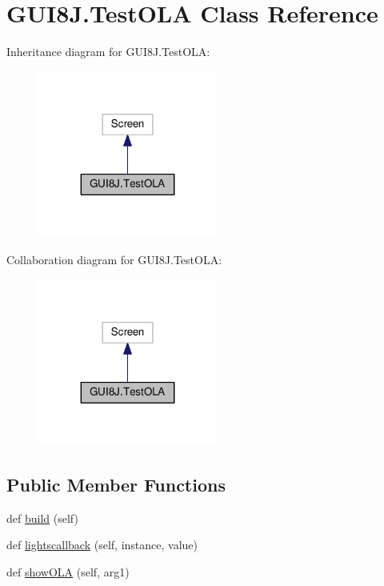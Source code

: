 \hypertarget{classGUI8J_1_1TestOLA}{}\section{G\+U\+I8\+J.\+Test\+O\+LA Class Reference}
\label{classGUI8J_1_1TestOLA}


Inheritance diagram for G\+U\+I8\+J.\+Test\+O\+LA\+:
\nopagebreak
\begin{figure}[H]
\begin{center}
\leavevmode
\includegraphics[width=167pt]{classGUI8J_1_1TestOLA__inherit__graph}
\end{center}
\end{figure}


Collaboration diagram for G\+U\+I8\+J.\+Test\+O\+LA\+:
\nopagebreak
\begin{figure}[H]
\begin{center}
\leavevmode
\includegraphics[width=167pt]{classGUI8J_1_1TestOLA__coll__graph}
\end{center}
\end{figure}
\subsection*{Public Member Functions}
\begin{DoxyCompactItemize}
\item 
def \hyperlink{classGUI8J_1_1TestOLA_a47fb9ef9e20bc4a64626590331057d60}{build} (self)
\item 
def \hyperlink{classGUI8J_1_1TestOLA_a12ec5bfda2ba9d420761f94685749f71}{lightscallback} (self, instance, value)
\item 
def \hyperlink{classGUI8J_1_1TestOLA_aee815c8adc3e28174c670bc78d2c3efe}{show\+O\+LA} (self, arg1)
\end{DoxyCompactItemize}
